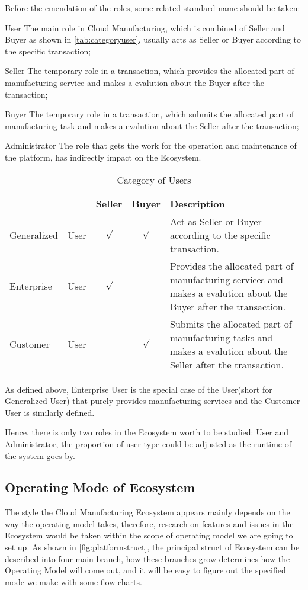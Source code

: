 Before the emendation of the roles, some related standard name should be taken:
\begin{asparadesc}
\item[User] The main role in Cloud Manufacturing, which is combined of Seller and Buyer as shown in \autoref{tab:categoryuser}, usually acts as Seller or Buyer according to the specific transaction;
\item[Seller] The temporary role in a transaction, which provides the allocated part of manufacturing service and makes a evalution about the Buyer after the transaction;
\item[Buyer] The temporary role in a transaction, which submits the allocated part of manufacturing task and makes a evalution about the Seller after the transaction;
\item[Administrator] The role that gets the work for the operation and maintenance of the platform, has indirectly impact on the Ecosystem.
\end{asparadesc}
\begin{table}[htbp]
  \centering\small
  \caption{Category of Users}
    \begin{tabularx}{\textwidth}{llccX}
    \toprule
        &  & Seller & Buyer & Description \\
    \midrule
    Generalized & User & $\surd$ & $\surd$ & Act as Seller or Buyer according to the specific transaction. \\
    Enterprise & User & $\surd$ & &  Provides the allocated part of manufacturing services and makes a evalution about the Buyer after the transaction. \\
    Customer & User& & $\surd$ &  Submits the allocated part of manufacturing tasks and makes a evalution about the Seller after the transaction.\\
    \bottomrule
    \end{tabularx}%
  \label{tab:categoryuser}%
\end{table}%
As defined above, Enterprise User is the special case of the User(short for Generalized User) that purely provides manufacturing services and the Customer User is similarly defined.

Hence, there is only two roles in the Ecosystem worth to be studied: User and Administrator, the proportion of user type could be adjusted as the runtime of the system goes by.

\subsection{Operating Mode of Ecosystem}
The style the Cloud Manufacturing Ecosystem appears mainly depends on the way the operating model takes, therefore, research on features and issues in the Ecosystem would be taken within the scope of operating model we are going to set up. As shown in \autoref{fig:platformstruct}, the principal struct of Ecosystem can be described into four main branch, how these branches grow determines how the Operating Model will come out, and it will be easy to figure out the specified mode we make with some flow charts.

